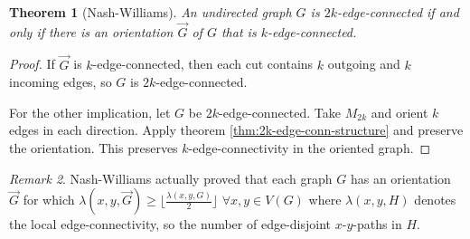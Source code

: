 \documentclass[11pt, a4paper]{article}
\newcommand{\floor}[1]{\lfloor #1 \rfloor}
\newtheorem{theorem}{Theorem}[section]
\theoremstyle{remark}
\newtheorem{remark}[theorem]{Remark}
\theoremstyle{definition}
\begin{document}
\begin{theorem}[Nash-Williams]
	An undirected graph $G$ is $2k$-edge-connected if and only if there is
	an orientation $\vec{G}$ of $G$ that is $k$-edge-connected.
\end{theorem}
\begin{proof}
	If $\vec{G}$ is $k$-edge-connected, then each cut contains $k$ outgoing
	and $k$ incoming edges, so $G$ is $2k$-edge-connected.

	For the other implication, let $G$ be $2k$-edge-connected. Take
	$M_{2k}$ and orient $k$ edges in each direction. Apply theorem
	\ref{thm:2k-edge-conn-structure} and preserve the orientation. This
	preserves $k$-edge-connectivity in the oriented graph.
\end{proof}

\begin{remark}
	Nash-Williams actually proved that each graph $G$ has an
	orientation $\vec{G}$ for which $\lambda(x,y,\vec{G})\geq
		\floor{\frac{\lambda(x,y,G)}{2}}$ $\forall x,y\in V(G)$ where
	$\lambda(x,y,H)$ denotes the local edge-connectivity, so the
	number of edge-disjoint $x$-$y$-paths in $H$.
\end{remark}
\end{document}
